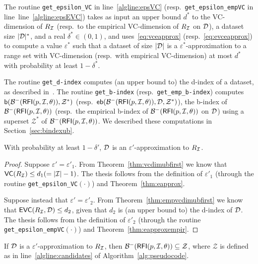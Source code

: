 \sloppy
The routine \texttt{get\_epsilon\_VC} in line~\ref{algline:epsVC} (resp.~\texttt{get\_epsilon\_empVC} in line~line~\ref{algline:epsEVC}) takes
as input an upper bound $d^*$ to the VC-dimension of $R_{\cal I}$ (resp.~to the empirical
VC-dimension of $R_{\cal I}$ on ${\cal D}$), a dataset size $|{\cal D}|^*$, and a real
$\delta^*\in(0,1)$, and uses~\eqref{eq:vceapprox} (resp.~\eqref{eq:evceapprox})
to compute a value $\varepsilon^*$ such that a dataset of size  $|{\cal D}|$ is a
$\varepsilon^*$-approximation to a range set with VC-dimension (resp.~with
empirical VC-dimension) at most $d^*$ with probability at least $1-\delta^*$.

The routine \texttt{get\_d-index} computes (an upper bound to) the d-index of a dataset, as
described in~\citep{RiondatoU12}. The routine
\texttt{get\_b-index} (resp.~\texttt{get\_emp\_b-index}) computes
$\mathsf{b}(\mathcal{B}^-(\mathsf{RFI}(p,{\cal I},\theta)),\mathcal{Z}^*)$
(resp.~$\mathsf{eb}(\mathcal{B}^-(\mathsf{RFI}(p,{\cal I},\theta)),{\cal D},\mathcal{Z}^*)$),  the b-index
of $\mathcal{B}^-(\mathsf{RFI}(p,{\cal I},\theta))$ (resp.~the empirical b-index of
$\mathcal{B}^-(\mathsf{RFI}(p,{\cal I},\theta))$ on ${\cal D}$) using a superset $\mathcal{Z}^*$
of $\mathcal{B}^-(\mathsf{RFI}(p,{\cal I},\theta))$. We described these computations in
Section~\ref{sec:bindexub}.

\begin{lemma}\label{lem:firsteapprox}
  With probability at least $1-\delta'$, ${\cal D}$ is an
  $\varepsilon'$-approximation to $R_{\cal I}$.
\end{lemma}

\begin{proof}
  Suppose $\varepsilon'=\varepsilon'_1$. From Theorem~\ref{thm:vcdimubfirst} we
  know that $\mathsf{VC}(R_{\cal I})\le d_1 (= |{\cal I}|-1)$.
  The thesis follows from the definition of $\varepsilon'_1$ (through the
  routine \texttt{get\_epsilon\_VC}$(\cdot)$) and Theorem~\ref{thm:eapprox}.

  Suppose instead that $\varepsilon'=\varepsilon'_2$. From
  Theorem~\ref{thm:empvcdimubfirst} we know that $\mathsf{EVC}(R_{\cal I},{\cal D})\le d_2$,
  given that $d_2$ is (an upper bound to) the d-index of ${\cal D}$. The thesis follows from the
  definition of $\varepsilon'_2$ (through the routine
  \texttt{get\_epsilon\_empVC}$(\cdot)$) and Theorem~\ref{thm:eapproxempir}.
\end{proof}

\begin{lemma}\label{lem:negbordersuperset}
  If ${\cal D}$ is a $\varepsilon'$-approximation to $R_{\cal I}$, then
  $\mathcal{B}^-(\mathsf{RFI}(p,{\cal I},\theta))\subseteq\mathcal{Z}$, where $\mathcal{Z}$
  is defined as in line~\ref{algline:candidates} of
  Algorithm~\ref{alg:pseudocode}.
\end{lemma}

